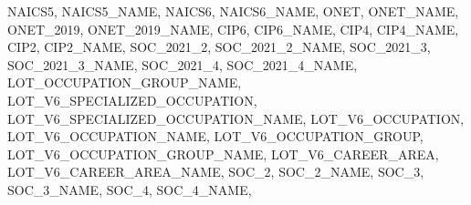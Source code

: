 \documentclass[
  letterpaper,
  DIV=11,
  numbers=noendperiod]{scrartcl}
\newenvironment{Shaded}{\begin{snugshade}}{\end{snugshade}}
\newcommand{\NormalTok}[1]{\textcolor[rgb]{0.00,0.23,0.31}{#1}}
\newcommand{\StringTok}[1]{\textcolor[rgb]{0.13,0.47,0.30}{#1}}
\begin{document}
\begin{Shaded}
\begin{Highlighting}[]
\StringTok{\textquotesingle{}NAICS5\textquotesingle{}}\NormalTok{, }\StringTok{\textquotesingle{}NAICS5\_NAME\textquotesingle{}}\NormalTok{, }\StringTok{\textquotesingle{}NAICS6\textquotesingle{}}\NormalTok{, }\StringTok{\textquotesingle{}NAICS6\_NAME\textquotesingle{}}\NormalTok{, }\StringTok{\textquotesingle{}ONET\textquotesingle{}}\NormalTok{, }\StringTok{\textquotesingle{}ONET\_NAME\textquotesingle{}}\NormalTok{, }\StringTok{\textquotesingle{}ONET\_2019\textquotesingle{}}\NormalTok{, }\StringTok{\textquotesingle{}ONET\_2019\_NAME\textquotesingle{}}\NormalTok{, }\StringTok{\textquotesingle{}CIP6\textquotesingle{}}\NormalTok{, }\StringTok{\textquotesingle{}CIP6\_NAME\textquotesingle{}}\NormalTok{, }\StringTok{\textquotesingle{}CIP4\textquotesingle{}}\NormalTok{, }\StringTok{\textquotesingle{}CIP4\_NAME\textquotesingle{}}\NormalTok{,}
\StringTok{\textquotesingle{}CIP2\textquotesingle{}}\NormalTok{, }\StringTok{\textquotesingle{}CIP2\_NAME\textquotesingle{}}\NormalTok{, }\StringTok{\textquotesingle{}SOC\_2021\_2\textquotesingle{}}\NormalTok{, }\StringTok{\textquotesingle{}SOC\_2021\_2\_NAME\textquotesingle{}}\NormalTok{, }\StringTok{\textquotesingle{}SOC\_2021\_3\textquotesingle{}}\NormalTok{, }\StringTok{\textquotesingle{}SOC\_2021\_3\_NAME\textquotesingle{}}\NormalTok{, }\StringTok{\textquotesingle{}SOC\_2021\_4\textquotesingle{}}\NormalTok{, }\StringTok{\textquotesingle{}SOC\_2021\_4\_NAME\textquotesingle{}}\NormalTok{, }\StringTok{\textquotesingle{}LOT\_OCCUPATION\_GROUP\_NAME\textquotesingle{}}\NormalTok{,}
\StringTok{\textquotesingle{}LOT\_V6\_SPECIALIZED\_OCCUPATION\textquotesingle{}}\NormalTok{, }\StringTok{\textquotesingle{}LOT\_V6\_SPECIALIZED\_OCCUPATION\_NAME\textquotesingle{}}\NormalTok{, }\StringTok{\textquotesingle{}LOT\_V6\_OCCUPATION\textquotesingle{}}\NormalTok{, }\StringTok{\textquotesingle{}LOT\_V6\_OCCUPATION\_NAME\textquotesingle{}}\NormalTok{, }\StringTok{\textquotesingle{}LOT\_V6\_OCCUPATION\_GROUP\textquotesingle{}}\NormalTok{,}
\StringTok{\textquotesingle{}LOT\_V6\_OCCUPATION\_GROUP\_NAME\textquotesingle{}}\NormalTok{, }\StringTok{\textquotesingle{}LOT\_V6\_CAREER\_AREA\textquotesingle{}}\NormalTok{, }\StringTok{\textquotesingle{}LOT\_V6\_CAREER\_AREA\_NAME\textquotesingle{}}\NormalTok{, }\StringTok{\textquotesingle{}SOC\_2\textquotesingle{}}\NormalTok{, }\StringTok{\textquotesingle{}SOC\_2\_NAME\textquotesingle{}}\NormalTok{, }\StringTok{\textquotesingle{}SOC\_3\textquotesingle{}}\NormalTok{, }\StringTok{\textquotesingle{}SOC\_3\_NAME\textquotesingle{}}\NormalTok{, }\StringTok{\textquotesingle{}SOC\_4\textquotesingle{}}\NormalTok{, }\StringTok{\textquotesingle{}SOC\_4\_NAME\textquotesingle{}}\NormalTok{,}

\end{Highlighting}
\end{Shaded}
\end{document}
